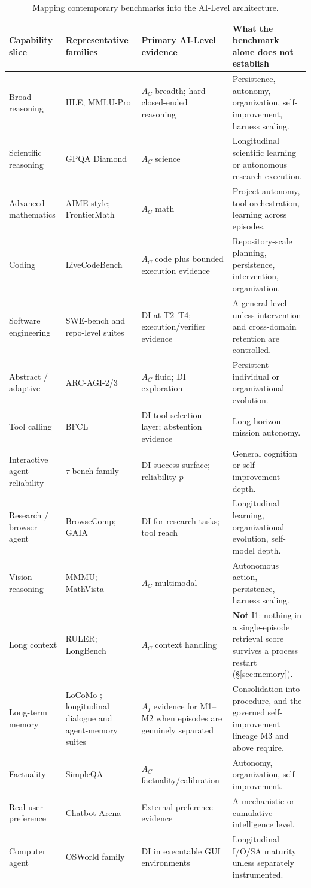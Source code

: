 \documentclass[11pt]{article}
\theoremstyle{definition}
\begin{document}
\begin{table}[!htbp]
\centering\scriptsize
\begin{tabularx}{\textwidth}{@{}lZZZ@{}}
\toprule
Capability slice & Representative families & Primary AI-Level evidence & What the benchmark alone does not establish \\
\midrule
Broad reasoning & HLE; MMLU-Pro & $A_C$ breadth; hard closed-ended reasoning & Persistence, autonomy, organization, self-improvement, harness scaling. \\
Scientific reasoning & GPQA Diamond & $A_C$ science & Longitudinal scientific learning or autonomous research execution. \\
Advanced mathematics & AIME-style; FrontierMath & $A_C$ math & Project autonomy, tool orchestration, learning across episodes. \\
Coding & LiveCodeBench & $A_C$ code plus bounded execution evidence & Repository-scale planning, persistence, intervention, organization. \\
Software engineering & SWE-bench and repo-level suites & DI at T2--T4; execution/verifier evidence & A general level unless intervention and cross-domain retention are controlled. \\
Abstract / adaptive & ARC-AGI-2/3 & $A_C$ fluid; DI exploration & Persistent individual or organizational evolution. \\
Tool calling & BFCL & DI tool-selection layer; abstention evidence & Long-horizon mission autonomy. \\
Interactive agent reliability & $\tau$-bench family & DI success surface; reliability $p$ & General cognition or self-improvement depth. \\
Research / browser agent & BrowseComp; GAIA & DI for research tasks; tool reach & Longitudinal learning, organizational evolution, self-model depth. \\
Vision + reasoning & MMMU; MathVista & $A_C$ multimodal & Autonomous action, persistence, harness scaling. \\
Long context & RULER; LongBench & $A_C$ context handling & \textbf{Not} I1: nothing in a single-episode retrieval score survives a process restart (\S\ref{sec:memory}). \\
Long-term memory & LoCoMo \citep{maharana2024locomo}; longitudinal dialogue and agent-memory suites & $A_I$ evidence for M1--M2 when episodes are genuinely separated & Consolidation into procedure, and the governed self-improvement lineage M3 and above require. \\
Factuality & SimpleQA & $A_C$ factuality/calibration & Autonomy, organization, self-improvement. \\
Real-user preference & Chatbot Arena & External preference evidence & A mechanistic or cumulative intelligence level. \\
Computer agent & OSWorld family & DI in executable GUI environments & Longitudinal I/O/SA maturity unless separately instrumented. \\
\bottomrule
\end{tabularx}
\caption{Mapping contemporary benchmarks into the AI-Level architecture.}
\label{tab:mapping}
\end{table}
\end{document}
